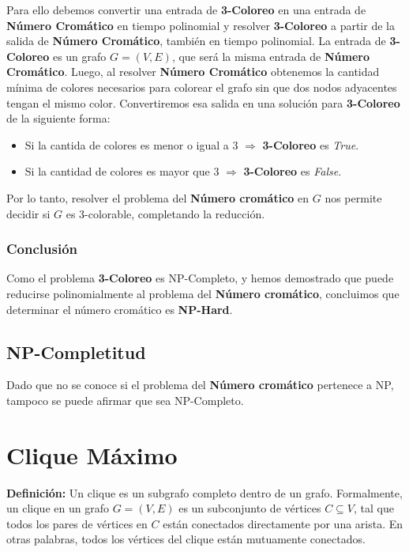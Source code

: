 \documentclass[a4paper,12pt]{article}
\begin{document}
Para ello debemos convertir una entrada de \textbf{3-Coloreo} en una entrada de \textbf{Número Cromático} en tiempo polinomial y resolver \textbf{3-Coloreo} a partir de la salida de \textbf{Número Cromático}, también en tiempo polinomial. La entrada de \textbf{3-Coloreo} es un grafo $G = (V, E)$, que será la misma entrada de \textbf{Número Cromático}. Luego, al resolver \textbf{Número Cromático} obtenemos la cantidad mínima de colores necesarios para colorear el grafo sin que dos nodos adyacentes tengan el mismo color. Convertiremos esa salida en una solución para \textbf{3-Coloreo} de la siguiente forma:
\begin{itemize}
    \item Si la cantida de colores es menor o igual a 3 $\Rightarrow$ \textbf{3-Coloreo} es \textit{True}.
    \item Si la cantidad de colores es mayor que 3 $\Rightarrow$ \textbf{3-Coloreo} es \textit{False}.
\end{itemize}

Por lo tanto, resolver el problema del \textbf{N\'umero crom\'atico} en $G$ nos permite decidir si $G$ es 3-colorable, completando la reducci\'on.

\subsubsection{Conclusi\'on}
Como el problema \textbf{3-Coloreo} es NP-Completo, y hemos demostrado que puede reducirse polinomialmente al problema del \textbf{N\'umero crom\'atico}, concluimos que determinar el n\'umero crom\'atico es \textbf{NP-Hard}.

\subsection{NP-Completitud}

Dado que no se conoce si el problema del \textbf{N\'umero crom\'atico} pertenece a NP, tampoco se puede afirmar que sea NP-Completo.




\section{Clique M\'aximo}


\textbf{Definici\'on:} Un clique es un subgrafo completo dentro de un grafo. Formalmente, un clique en un grafo $G = (V, E)$ es un subconjunto de v\'ertices $C \subseteq V$, tal que todos los pares de v\'ertices en $C$ est\'an conectados directamente por una arista. En otras palabras, todos los v\'ertices del clique est\'an mutuamente conectados.
\end{document}
